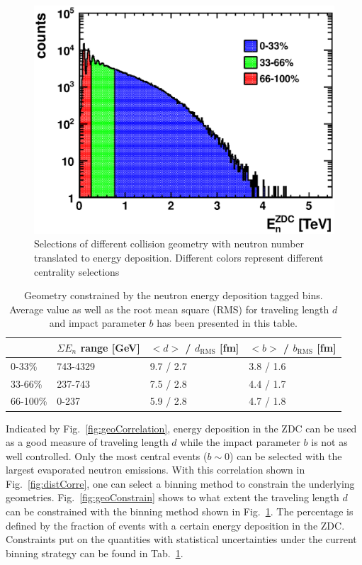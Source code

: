 \begin{figure}
\begin{center}
\includegraphics[width=0.7\columnwidth,keepaspectratio]{plots/chpt7/tau9_neutron_bin_selection.eps}
\caption[Neutron binning method]{Selections of different collision geometry with neutron number translated to energy deposition. Different colors represent different centrality selections}
\label{fig:neutronBin}
\end{center}
\end{figure}


\begin{table}[width=0.85\columnwidth]
\centering
\begin{tabular}{ |l || l | l | l | } \hline 
		& $\Sigma E_{n}$ range [GeV] & $<d>$ / $d_{\mathrm{RMS}}$ [fm] & $<b>$ / $b_{\mathrm{RMS}}$ [fm] 	\\ \hline
0-33\%	& 743-4329		&	9.7 / 2.7	& 3.8 / 1.6	 \\ \hline
33-66\%	& 237-743		&	7.5 / 2.8	& 4.4 / 1.7	\\ \hline
66-100\%& 0-237			&	5.9 / 2.8	& 4.7 / 1.8	\\ \hline
\end{tabular}
\caption[Constrained geometry]{Geometry constrained by the neutron energy deposition tagged bins. Average value as well as the root mean square (RMS) for traveling length $d$ and impact parameter $b$ has been presented in this table.}
\label{tab:geoConstr}
\end{table}


Indicated by Fig.~\ref{fig:geoCorrelation}, energy deposition in the ZDC can be used
as a good measure of traveling length $d$ while the impact parameter $b$ is not as
well controlled. 
Only the most central events ($b\sim0$) can be selected with the largest
evaporated neutron emissions. With this correlation shown in
Fig.~\ref{fig:distCorre}, one can select a binning method to constrain the
underlying geometries. Fig.~\ref{fig:geoConstrain} shows to what extent the
traveling length $d$ can be constrained with the binning method shown in
Fig.~\ref{fig:neutronBin}. The percentage is defined by the fraction of events with
a certain energy deposition in the ZDC.
Constraints put on the quantities with statistical uncertainties under the
current binning strategy can be found in Tab.~\ref{tab:geoConstr}.


